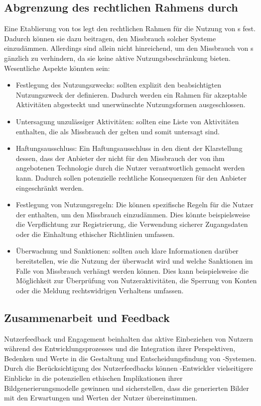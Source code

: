 \documentclass[hidelinks,12pt]{report}
\begin{document}
\subsection{Abgrenzung des rechtlichen Rahmens durch }
Eine Etablierung von \Gls{tos} legt den rechtlichen Rahmen für die Nutzung von s fest. Dadurch können sie dazu beitragen, den Missbrauch solcher Systeme einzudämmen. 
Allerdings sind  allein nicht hinreichend, um den Missbrauch von s gänzlich zu verhindern, da sie keine aktive Nutzungsbeschränkung bieten. Wesentliche Aspekte könnten sein:\\

\begin{itemize}
    \item Festlegung des Nutzungszwecks:  sollten explizit den beabsichtigten Nutzungszweck der  definieren. Dadurch werden ein Rahmen für akzeptable Aktivitäten abgesteckt und unerwünschte Nutzungsformen ausgeschlossen.
    \item Untersagung unzulässiger Aktivitäten:  sollten eine Liste von Aktivitäten enthalten, die als Missbrauch der  gelten und somit untersagt sind.
    \item Haftungsausschluss: Ein Haftungsausschluss in den  dient der Klarstellung dessen, dass der Anbieter der  nicht für den Missbrauch der von ihm angebotenen Technologie durch die Nutzer verantwortlich gemacht werden kann. Dadurch sollen potenzielle rechtliche Konsequenzen für den Anbieter eingeschränkt werden.
    \item Festlegung von Nutzungsregeln: Die   können spezifische Regeln für die Nutzer der  enthalten, um den Missbrauch einzudämmen. Dies könnte beispielsweise die Verpflichtung zur Registrierung, die Verwendung sicherer Zugangsdaten oder die Einhaltung ethischer Richtlinien umfassen.
    \item Überwachung und Sanktionen:  sollten auch klare Informationen darüber bereitstellen, wie die Nutzung der  überwacht wird und welche Sanktionen im Falle von Missbrauch verhängt werden können. Dies kann beispielsweise die Möglichkeit zur Überprüfung von Nutzeraktivitäten, die Sperrung von Konten oder die Meldung rechtswidrigen Verhaltens umfassen.
\end{itemize}

\subsection{Zusammenarbeit und Feedback}
Nutzerfeedback und Engagement beinhalten das aktive Einbeziehen von Nutzern während des Entwicklungsprozesses und die Integration ihrer Perspektiven, Bedenken und Werte in die Gestaltung und Entscheidungsfindung von -Systemen. Durch die Berücksichtigung des Nutzerfeedbacks können -Entwickler vielseitigere Einblicke in die potenziellen ethischen Implikationen ihrer Bildgenerierungsmodelle gewinnen und sicherstellen, dass die generierten Bilder mit den Erwartungen und Werten der Nutzer übereinstimmen.
\end{document}
